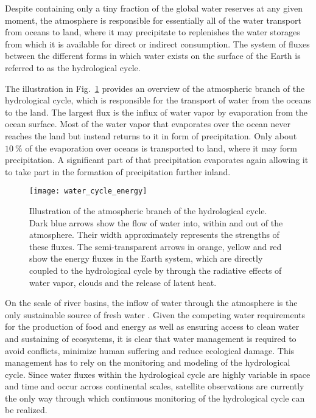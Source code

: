 Despite containing only a tiny fraction of the global water reserves at any
given moment, the atmosphere is responsible for essentially all of the water
transport from oceans to land, where it may precipitate to replenishes the water
storages from which it is available for direct or indirect consumption. The
system of fluxes between the different forms in which water exists on the
surface of the Earth is referred to as the hydrological cycle.

The illustration in Fig.~\ref{fig:introduction:water_cycle} provides an overview
of the atmospheric branch of the hydrological cycle, which is responsible for
the transport of water from the oceans to the land. The largest flux is the
influx of water vapor by evaporation from the ocean surface. Most of the water
vapor that evaporates over the ocean never reaches the land but instead returns
to it in form of precipitation. Only about $\SI{10}{\percent}$ of the
evaporation over oceans is transported to land, where it may form precipitation. A
significant part of that precipitation evaporates again allowing it to take part
in the formation of precipitation further inland.

\begin{figure}
\centering
\texttt{[image: water\_cycle\_energy]}
\caption{
Illustration of the atmospheric branch of the hydrological cycle. Dark blue
arrows show the flow of water into, within and out of the atmosphere. Their
width approximately represents the strengths of these fluxes. The
semi-transparent arrows in orange, yellow and red show the energy fluxes in the
Earth system, which are directly coupled to the hydrological cycle by through
the radiative effects of water vapor, clouds and the release of latent heat.}
\label{fig:introduction:water_cycle}
\end{figure}

On the scale of river basins, the inflow of water through the atmosphere is the
only sustainable source of fresh water \citep{falkenmark04}. Given the competing
water requirements for the production of food and energy as well as ensuring
access to clean water and  sustaining of ecosystems, it is clear that water
management is required to avoid conflicts, minimize human suffering and reduce
ecological damage. This management has to rely on the monitoring and modeling of
the hydrological cycle. Since water fluxes within the hydrological cycle are
highly variable in space and time and occur across continental scales, satellite
observations are currently the only way through which continuous monitoring of
the hydrological cycle can be realized.


